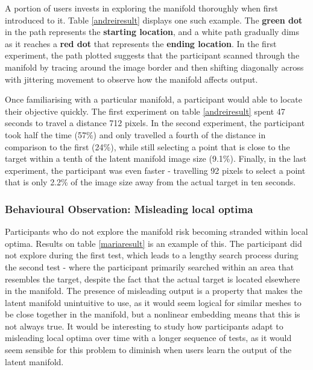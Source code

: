\documentclass[ %
author={Dillon Keith Diep},
supervisor={Dr. Carl Henrik Ek},
degree={MEng},
title={ART-CG Hair:},
subtitle={Assisted Real-time Content Generation of Stylised Virtual Hair},
type={Research},
year={2017} ]{dissertation}
\begin{document}
A portion of users invests in exploring the manifold thoroughly when first introduced to it. Table \ref{andreiresult} displays one such example. The \textbf{green dot} in the path represents the \textbf{starting location}, and a white path gradually dims as it reaches a \textbf{red dot} that represents the \textbf{ending location}. In the first experiment, the path plotted suggests that the participant scanned through the manifold by tracing around the image border and then shifting diagonally across with jittering movement to observe how the manifold affects output.

Once familiarising with a particular manifold, a participant would able to locate their objective quickly. The first experiment on table \ref{andreiresult} spent 47 seconds to travel a distance 712 pixels. In the second experiment, the participant took half the time (57\%) and only travelled a fourth of the distance in comparison to the first (24\%), while still selecting a point that is close to the target within a tenth of the latent manifold image size (9.1\%). Finally, in the last experiment, the participant was even faster - travelling 92 pixels to select a point that is only 2.2\% of the image size away from the actual target in ten seconds.

\subsubsection{Behavioural Observation: Misleading local optima}

Participants who do not explore the manifold risk becoming stranded within local optima. Results on table \ref{mariaresult} is an example of this. The participant did not explore during the first test, which leads to a lengthy search process during the second test - where the participant primarily searched within an area that resembles the target, despite the fact that the actual target is located elsewhere in the manifold. The presence of misleading output is a property that makes the latent manifold unintuitive to use, as it would seem logical for similar meshes to be close together in the manifold, but a nonlinear embedding means that this is not always true. It would be interesting to study how participants adapt to misleading local optima over time with a longer sequence of tests, as it would seem sensible for this problem to diminish when users learn the output of the latent manifold.
\end{document}
